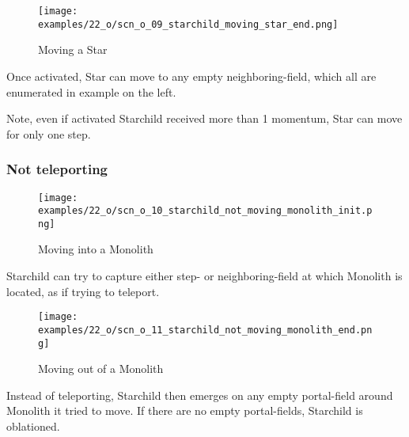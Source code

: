 \vspace*{2.1\baselineskip}
\noindent
\begin{wrapfigure}[7]{l}{0.4\textwidth}
\centering
\texttt{[image: examples/22\_o/scn\_o\_09\_starchild\_moving\_star\_end.png]}
\caption{Moving a Star}
\label{fig:scn_o_09_starchild_moving_star_end}
\end{wrapfigure}
Once activated, Star can move to any empty neighboring-field, which all are enumerated in
example on the left.

Note, even if activated Starchild received more than 1 momentum, Star can move for only one step.

\clearpage %

\subsubsection*{Not teleporting}

\noindent
\begin{wrapfigure}[4]{l}{0.4\textwidth}
\centering
\texttt{[image: examples/22\_o/scn\_o\_10\_starchild\_not\_moving\_monolith\_init.png]}
\caption{Moving into a Monolith}
\label{fig:scn_o_10_starchild_not_moving_monolith_init}
\end{wrapfigure}
Starchild can try to capture either step- or neighboring-field at which Monolith is located,
as if trying to teleport.

\vspace*{7.1\baselineskip}
\noindent
\begin{wrapfigure}[5]{l}{0.4\textwidth}
\centering
\texttt{[image: examples/22\_o/scn\_o\_11\_starchild\_not\_moving\_monolith\_end.png]}
\caption{Moving out of a Monolith}
\label{fig:scn_o_11_starchild_not_moving_monolith_end}
\end{wrapfigure}
Instead of teleporting, Starchild then emerges on any empty portal-field around Monolith
it tried to move. If there are no empty portal-fields, Starchild is oblationed.

\clearpage %

